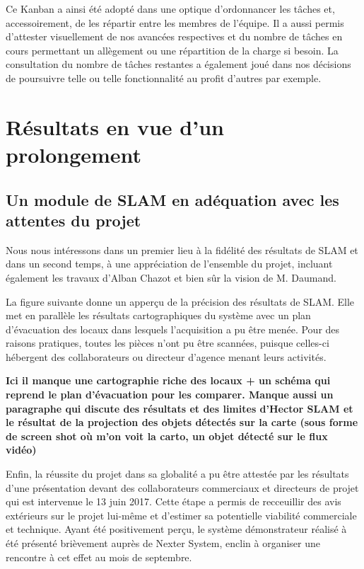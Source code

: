   Ce Kanban a ainsi été adopté dans une optique d'ordonnancer les tâches et, accessoirement, de les répartir entre les membres de l'équipe. 
  Il a aussi permis d'attester visuellement de nos avancées respectives et du nombre de tâches en cours permettant un allègement ou une répartition de la charge si besoin.
  La consultation du nombre de tâches restantes a également joué dans nos décisions de poursuivre telle ou telle fonctionnalité au profit d'autres par exemple. 
  
\section{Résultats en vue d'un prolongement}  
  \subsection{Un module de SLAM en adéquation avec les attentes du projet}
  
  Nous nous intéressons dans un premier lieu à la fidélité des résultats de SLAM et dans un second temps, à une appréciation de l'ensemble du projet, incluant également les travaux d'Alban Chazot et bien sûr la vision de M. Daumand.  
  
  La figure suivante donne un apperçu de la précision des résultats de SLAM. 
  Elle met en parallèle les résultats cartographiques du système avec un plan d'évacuation des locaux dans lesquels l'acquisition a pu être menée. 
  Pour des raisons pratiques, toutes les pièces n'ont pu être scannées, puisque celles-ci hébergent des collaborateurs ou directeur d'agence menant leurs activités. 
  
  \textbf{Ici il manque une cartographie riche des locaux + un schéma qui reprend le plan d'évacuation pour les comparer. Manque aussi un paragraphe qui discute des résultats et des limites d'Hector SLAM et le résultat de 
  la projection des objets détectés sur la carte (sous forme de screen shot où m'on voit la carto, un objet détecté sur le flux vidéo)}
  
  Enfin, la réussite du projet dans sa globalité a pu être attestée par les résultats d'une présentation devant des collaborateurs commerciaux et directeurs de projet qui est intervenue le 13 juin 2017.
  Cette étape a permis de recceuillir des avis extérieurs sur le projet lui-même et d'estimer sa potentielle viabilité commerciale et technique. 
  Ayant été positivement perçu, le système démonstrateur réalisé à été présenté brièvement auprès de Nexter System, enclin à organiser une rencontre à cet effet au mois de septembre. 
  
